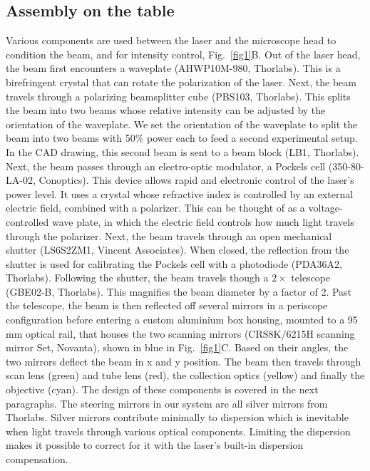 \documentclass[10pt,letterpaper]{article}
\begin{document}
\subsection*{Assembly on the table}
Various components are used between the laser and the microscope head to condition the beam, and  for intensity control, Fig.~\ref{fig1}B. Out of the laser head, the beam first encounters a waveplate (AHWP10M-980, Thorlabs). This is a birefringent crystal that can rotate the polarization of the laser. Next, the beam travels through a polarizing beamsplitter cube (PBS103, Thorlabs). This splits the beam into two beams whose relative intensity can be adjusted by the orientation of the waveplate. We set the orientation of the waveplate to split the beam into two beams with 50\% power each to feed a second experimental setup. In the CAD drawing, this second beam is sent to a beam block (LB1, Thorlabs). Next, the beam passes through an electro-optic modulator, a Pockels cell (350-80-LA-02, Conoptics). This device allows rapid and electronic control of the laser's power level. It uses a crystal whose refractive index is controlled by an external electric field, combined with a polarizer. This can be thought of as a voltage-controlled wave plate, in which the electric field controls how much light travels through the polarizer. Next, the beam travels through an open mechanical shutter (LS6S2ZM1, Vincent Associates). When closed, the reflection from the shutter is used for calibrating the Pockels cell with a photodiode (PDA36A2, Thorlabs). Following the shutter, the beam travels though a $2\times$ telescope (GBE02-B, Thorlabs). This magnifies the beam diameter by a factor of 2. Past the telescope, the beam is then reflected off several mirrors in a periscope configuration before entering a custom aluminium box housing, mounted to a 95 mm optical rail, that houses the two scanning mirrors (CRS8K/6215H scanning mirror Set, Novanta), shown in blue in  Fig.~\ref{fig1}C. Based on their angles, the two mirrors deflect the beam in x and y position. The beam then travels through scan lens (green) and tube lens (red), the collection optics (yellow) and finally the objective (cyan). The design of these components is covered in the next paragraphs. The steering mirrors in our system are all silver mirrors from Thorlabs. Silver mirrors contribute minimally to dispersion which is inevitable when light travels through various optical components. Limiting the dispersion makes it possible to correct for it with the laser's built-in dispersion compensation. 
\end{document}

